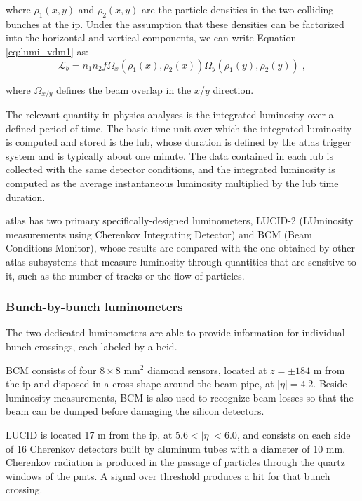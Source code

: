 \noindent where $\rho_1(x,y)$ and $\rho_2(x,y)$ are the particle densities in the two colliding bunches at the \gls{ip}. 
Under the assumption that these densities can be factorized into the horizontal and vertical components, we can write Equation \ref{eq:lumi_vdm1} as:
\begin{equation}
\mathcal{L}_b = n_1 n_2 f  \Omega_x(\rho_1(x), \rho_2(x)) \Omega_y(\rho_1(y), \rho_2(y))  \; , \nonumber
\label{eq:lumi_vdm2}
\end{equation}

\noindent where $\Omega_{x/y}$ defines the beam overlap in the $x$/$y$ direction.

The relevant quantity in physics analyses is the integrated luminosity over a defined period of time. The basic time unit over which the integrated luminosity is computed and stored is the \gls{lub}, whose duration is defined by the \gls{atlas} trigger system and is typically about one minute. The data contained in each \gls{lub} is collected with the same detector conditions, and the integrated luminosity is computed as the average instantaneous luminosity multiplied by the \gls{lub} time duration.

\gls{atlas} has two primary specifically-designed luminometers, LUCID-2 (LUminosity measurements using Cherenkov Integrating Detector) and BCM (Beam Conditions Monitor), whose results are compared with the one obtained by other \gls{atlas} subsystems that measure luminosity through quantities that are sensitive to it, such as the number of tracks or the flow of particles.

\subsubsection*{Bunch-by-bunch luminometers}

The two dedicated luminometers are able to provide information for individual bunch crossings, each labeled by a \gls{bcid}.

BCM consists of four $8 \times 8$ mm$^2$ diamond sensors, located at $z= \pm 184$ m from the \gls{ip} and disposed in a cross shape around the beam pipe, at $|\eta| = 4.2$. Beside luminosity measurements, BCM is also used to recognize beam losses so that the beam can be dumped before damaging the silicon detectors. 

LUCID is located 17 m from the \gls{ip}, at $5.6 < |\eta| < 6.0$, and consists on each side of 16 Cherenkov detectors built by aluminum tubes with a diameter of 10 mm. Cherenkov radiation is produced in the passage of particles through the quartz windows of the \glspl{pmt}. A signal over threshold produces a hit for that bunch crossing.


